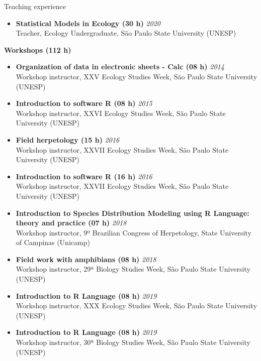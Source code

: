 \documentclass{resume}
\begin{document}
\begin{rSection}{Teaching experience}
\begin{itemize}
\item {\bf Statistical Models in Ecology (30 h)} \hfill{\em 2020}\\
Teacher, Ecology Undergraduate, São Paulo State University (UNESP)

\end{itemize}

{\bf Workshops (112 h)}
\begin{itemize}
\item {\bf Organization of data in electronic sheets - Calc (08 h)} \hfill{\em 2014}\\
Workshop instructor, XXV Ecology Studies Week, São Paulo State University (UNESP) 

\item {\bf Introduction to software R (08 h)} \hfill{\em 2015}\\
Workshop instructor, XXVI Ecology Studies Week, São Paulo State University (UNESP) 

\item {\bf Field herpetology (15 h)} \hfill{\em 2016}\\
Workshop instructor, XXVII Ecology Studies Week, São Paulo State University (UNESP) 

\item {\bf Introduction to software R (16 h)} \hfill{\em 2016}\\
Workshop instructor, XXVII Ecology Studies Week, São Paulo State University (UNESP) 

\item {\bf Introduction to Species Distribution Modeling using R Language: theory and practice (07 h)} \hfill{\em 2018}\\
Workshop instructor, 9º Brazilian Congress of Herpetology, State University of Campinas (Unicamp)

\item {\bf Field work with amphibians (08 h)} \hfill{\em 2018}\\
Workshop instructor, 29ª Biology Studies Week, São Paulo State University (UNESP) 

\item {\bf Introduction to R Language (08 h)} \hfill{\em 2019}\\
Workshop instructor, XXX Ecology Studies Week, São Paulo State University (UNESP) 

\item {\bf Introduction to R Language (08 h)} \hfill{\em 2019}\\
Workshop instructor, 30ª Biology Studies Week, São Paulo State University (UNESP)


\end{itemize}
\end{rSection}
\end{document}
